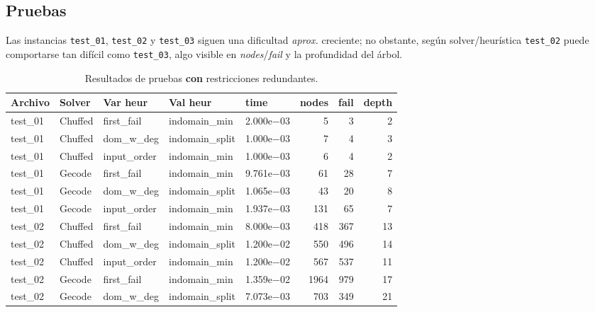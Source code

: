 
\subsection{Pruebas}\label{sec:01-sudoku-pruebas}
\noindent
\noindent
Las instancias \texttt{test\_01}, \texttt{test\_02} y \texttt{test\_03} siguen una dificultad \emph{aprox.} creciente; no obstante, según solver/heurística \texttt{test\_02} puede comportarse tan difícil como \texttt{test\_03}, algo visible en \emph{nodes}/\emph{fail} y la profundidad del árbol.

\begin{compactfloats}
\begin{table}[H]
  \centering
  \small
  \setlength{\tabcolsep}{1.8pt}
  \caption{Resultados de pruebas \textbf{con} restricciones redundantes.}
  \label{tab:pruebas-sudoku-on}
  \begin{tabular}{l l l l l r r r}
    \toprule
    \textbf{Archivo} & \textbf{Solver} & \textbf{Var heur} & \textbf{Val heur} & \textbf{time} & \textbf{nodes} & \textbf{fail} & \textbf{depth} \\
    \midrule
    test\_01 & Chuffed & first\_fail  & indomain\_min   & 2.000e$-$03 & 5    & 3    & 2 \\
    test\_01 & Chuffed & dom\_w\_deg  & indomain\_split & 1.000e$-$03 & 7    & 4    & 3 \\
    test\_01 & Chuffed & input\_order & indomain\_min   & 1.000e$-$03 & 6    & 4    & 2 \\
    test\_01 & Gecode  & first\_fail  & indomain\_min   & 9.761e$-$03 & 61   & 28   & 7 \\
    test\_01 & Gecode  & dom\_w\_deg  & indomain\_split & 1.065e$-$03 & 43   & 20   & 8 \\
    test\_01 & Gecode  & input\_order & indomain\_min   & 1.937e$-$03 & 131  & 65   & 7 \\
    \midrule
    test\_02 & Chuffed & first\_fail  & indomain\_min   & 8.000e$-$03 & 418  & 367  & 13 \\
    test\_02 & Chuffed & dom\_w\_deg  & indomain\_split & 1.200e$-$02 & 550  & 496  & 14 \\
    test\_02 & Chuffed & input\_order & indomain\_min   & 1.200e$-$02 & 567  & 537  & 11 \\
    test\_02 & Gecode  & first\_fail  & indomain\_min   & 1.359e$-$02 & 1964 & 979  & 17 \\
    test\_02 & Gecode  & dom\_w\_deg  & indomain\_split & 7.073e$-$03 & 703  & 349  & 21 \\

\end{tabular}
\end{table}
\end{compactfloats}

